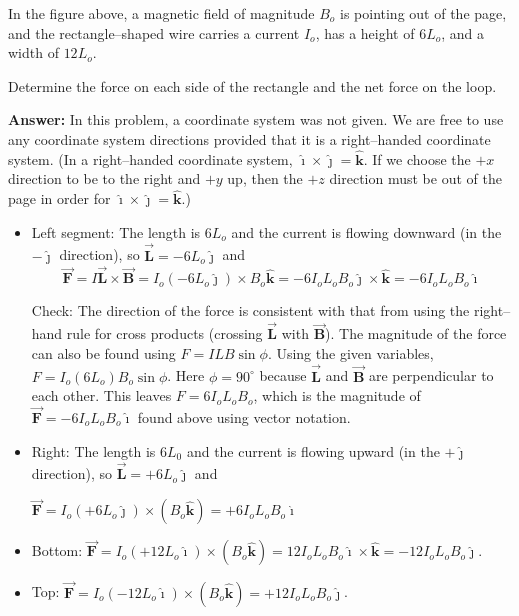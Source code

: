 \documentclass{article}
\newcommand{\ihat}[0]{\hat{\boldsymbol{\imath}}}
\newcommand{\jhat}[0]{\hat{\boldsymbol{\jmath}}}
\newcommand{\khat}[0]{\hat{\boldsymbol{k}}}
\newcommand{\bfvec}[1]{\vec{\mathbf{#1}}}
\begin{document}


In the figure above, a magnetic field of magnitude $B_o$ is pointing out of the page, and the rectangle--shaped wire carries a current $I_o$, has a height of $6L_o$, and a width of $12L_o$.

Determine the force on each side of the rectangle and the net force on the loop.

{\bf Answer: } In this problem, a coordinate system was not given. We are free to use any coordinate system directions provided that it is a right--handed coordinate system. (In a right--handed coordinate system, $\ihat\times\jhat=\khat$. If we choose the $+x$ direction to be to the right and $+y$ up, then the $+z$ direction must be out of the page in order for $\ihat\times\jhat=\khat$.)



\begin{itemize}

  \item Left segment: The length is $6L_o$ and the current is flowing downward (in the $-\jhat$ direction), so $\bfvec{L} = -6L_o\jhat$ and \begin{equation}
        \bfvec{F} = I\bfvec{L}\times\bfvec{B} = I_o(-6L_o\jhat)\times B_o\khat=-6I_oL_oB_o\jhat\times \khat=-6I_oL_oB_o\ihat
        \end{equation}

        Check: The direction of the force is consistent with that from using the right--hand rule for cross products (crossing $\bfvec{L}$ with $\bfvec{B}$). The magnitude of the force can also be found using $F=ILB\sin\phi$. Using the given variables, $F=I_o(6L_o)B_o\sin\phi$. Here $\phi=90^\circ$ because $\bfvec{L}$ and $\bfvec{B}$ are perpendicular to each other. This leaves $F=6I_oL_oB_o$, which is the magnitude of $\bfvec{F}=-6I_oL_oB_o\ihat$ found above using vector notation.

  \item Right: The length is $6L_0$ and the current is flowing upward (in the $+\jhat$ direction), so $\bfvec{L} = +6L_o\jhat$ and

        $\bfvec{F}=I_o(+6L_o\jhat)\times (B_o\khat)=+6I_oL_oB_o\ihat$

  \item Bottom: $\bfvec{F}=I_o(+12L_o\ihat)\times (B_o\khat) = 12I_oL_oB_o\ihat\times\khat = -12I_oL_oB_o\jhat$.

  \item Top: $\bfvec{F}=I_o(-12L_o\ihat)\times (B_o\khat)=+12I_oL_oB_o\jhat$.

\end{itemize}
\end{document}
